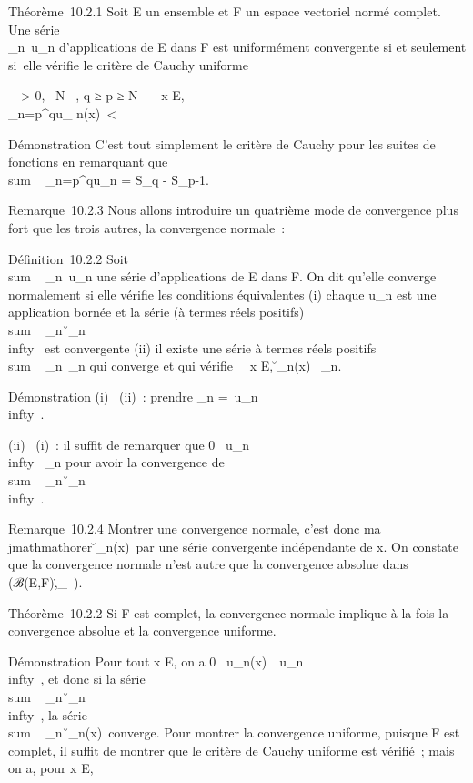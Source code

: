 \documentclass[]{article}
\begin{document}
Théorème~10.2.1 Soit E un ensemble et F un espace vectoriel normé
complet. Une série \\\sum
 _n\in{}~u_n d'applications de E dans F est uniformément
convergente si et seulement si~elle vérifie le critère de Cauchy
uniforme

\forall~~\epsilon \textgreater{} 0,
\exists~N \in {}~, q ≥ p ≥ N
\rigtharrow~\forall~~x \in E,
\\\sum
_n=p^qu_ n(x)\
\textless{} \epsilon

Démonstration C'est tout simplement le critère de Cauchy pour les suites
de fonctions en remarquant que
\\sum ~
_n=p^qu_n = S_q - S_p-1.

Remarque~10.2.3 Nous allons introduire un quatrième mode de convergence
plus fort que les trois autres, la convergence normale~:

Définition~10.2.2 Soit
\\sum ~
_n\in{}~u_n une série d'applications de E dans F. On dit
qu'elle converge normalement si elle vérifie les conditions équivalentes
(i) chaque u_n est une application bornée et la série (à termes
réels positifs) \\sum ~
_n\in{}~\u_n\\infty~
est convergente (ii) il existe une série à termes réels positifs
\\sum ~
_n\in{}~\alpha_n qui converge et qui vérifie
\forall~~x \in E,
\u_n(x)\ \leq
\alpha_n.

Démonstration (i) \rigtharrow~(ii)~: prendre \alpha_n
=\ u_n\\infty~.

(ii) \rigtharrow~(i)~: il suffit de remarquer que 0 \leq\
u_n\\infty~ \leq \alpha_n pour avoir la
convergence de \\sum ~
_n\in{}~\u_n\\infty~.

Remarque~10.2.4 Montrer une convergence normale, c'est donc ma\\jmathmathorer
\u_n(x)\ par
une série convergente indépendante de x. On constate que la convergence
normale n'est autre que la convergence absolue dans
(ℬ(E,F),\._\infty~).

Théorème~10.2.2 Si F est complet, la convergence normale implique à la
fois la convergence absolue et la convergence uniforme.

Démonstration Pour tout x \in E, on a 0 \leq\
u_n(x)\ \leq\
u_n\\infty~, et donc si la série
\\sum ~
_n\in{}~\u_n\\infty~,
la série \\sum ~
_n\in\mathbb{N}~\u_n(x)\
converge. Pour montrer la convergence uniforme, puisque F est complet,
il suffit de montrer que le critère de Cauchy uniforme est vérifié~;
mais on a, pour x \in E,
\end{document}
